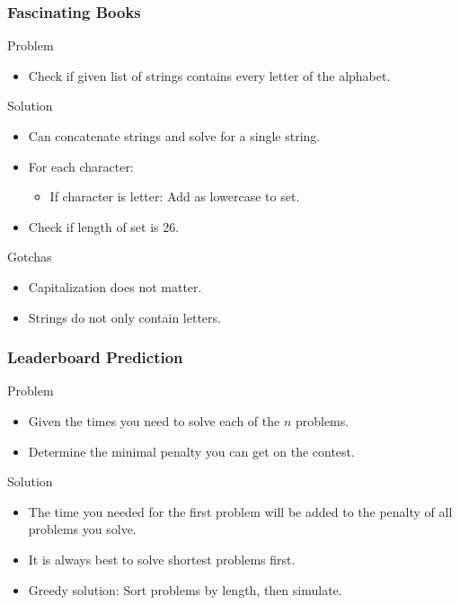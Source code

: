 \documentclass{beamer}
\begin{document}
\begin{frame}
    \frametitle{Fascinating Books}
    \begin{block}{Problem}
        \begin{itemize}
            \item Check if given list of strings contains every letter of the alphabet.
        \end{itemize}
    \end{block} \pause
    \begin{block}{Solution}
        \begin{itemize}
            \item Can concatenate strings and solve for a single string. \pause
            \item For each character:
            \begin{itemize}
            \item If character is letter: Add as lowercase to set. \pause
            \end{itemize}
        \item Check if length of set is 26.
        \end{itemize}
    \end{block} \pause
    \begin{block}{Gotchas}
        \begin{itemize}
            \item Capitalization does not matter. \pause
            \item Strings do not only contain letters.
        \end{itemize}
    \end{block} 
\end{frame}

\begin{frame}
    \frametitle{Leaderboard Prediction}
    \begin{block}{Problem}
        \begin{itemize}
            \item Given the times you need to solve each of the $n$ problems.
            \item Determine the minimal penalty you can get on the contest.
        \end{itemize}
    \end{block} \pause
    \begin{block}{Solution}
        \begin{itemize}
            \item The time you needed for the first problem will be added to the penalty of all problems you solve.
            \pause
            \item It is always best to solve shortest problems first.
            \pause
            \item Greedy solution: Sort problems by length, then simulate.
        \end{itemize}
    \end{block} 
\end{frame}
\end{document}
